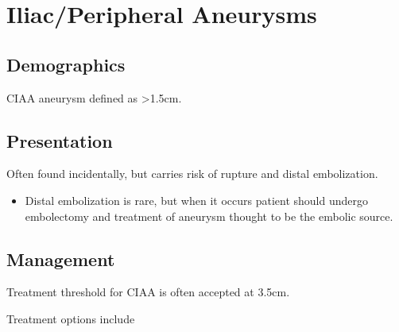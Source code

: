 \documentclass[
]{book}
\providecommand{\tightlist}{%
  \setlength{\itemsep}{0pt}\setlength{\parskip}{0pt}}
\begin{document}
\hypertarget{iliacperipheral-aneurysms}{%
\section{Iliac/Peripheral Aneurysms}\label{iliacperipheral-aneurysms}}

\hypertarget{demographics-2}{%
\subsection{Demographics}\label{demographics-2}}

CIAA aneurysm defined as \textgreater1.5cm.

\hypertarget{presentation-9}{%
\subsection{Presentation}\label{presentation-9}}

Often found incidentally, but carries risk of rupture and distal
embolization.

\begin{itemize}
\tightlist
\item
  Distal embolization is rare, but when it occurs patient should
  undergo embolectomy and treatment of aneurysm thought to be the
  embolic source.\citep{bacharach2008, ferreira2010, nachbur1991}
\end{itemize}

\hypertarget{management-16}{%
\subsection{Management}\label{management-16}}

Treatment threshold for CIAA is often accepted at 3.5cm.\citep{dix2005, laine2017}

Treatment options include
\end{document}
